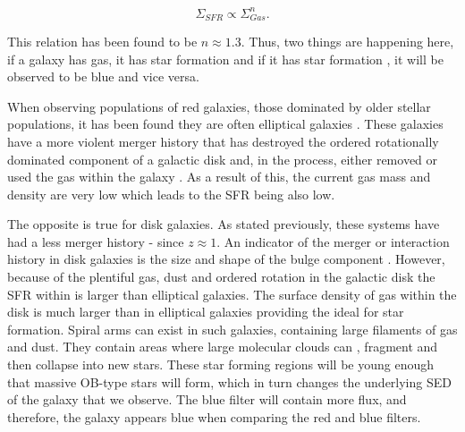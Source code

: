 \begin{equation}\label{eq:ks-law}
\Sigma_{SFR} \propto \Sigma_{Gas}^{n}. 
\end{equation}

\noindent This relation has been found to be $n\approx1.3$. Thus, two things are happening here, if a galaxy has \DIFaddbegin {}\DIFaddend gas, it has star formation and if it has star formation \DIFaddbegin {}\DIFaddend , it will be observed to be blue and vice versa.

When observing populations of red galaxies, those dominated by older stellar populations, it has been found they are often elliptical galaxies \citep{1992MNRAS.254..589B}. These galaxies have a more violent merger history that has destroyed the ordered rotationally dominated component of a galactic disk and, in the process, either removed or used the gas within the galaxy \citep{1976ApJ...204..365F}. As a result of this, the current gas mass and density are very low which leads to the SFR being also low.

The opposite is true for disk galaxies. As stated previously, these systems have had a less \DIFdelbegin {}\DIFdelend \DIFaddbegin {}\DIFaddend merger history - \DIFdelbegin {}\DIFdelend \DIFaddbegin {}\DIFaddend since $z \approx 1$. An indicator of the merger or interaction history in disk galaxies is the size and shape of the bulge component \citep{2011MNRAS.414..888E}. However, because of the plentiful gas, dust and ordered rotation in the galactic disk the SFR within is larger than elliptical galaxies. The surface density of gas within the disk is much larger than in elliptical galaxies providing the ideal for star formation. Spiral arms can exist in such galaxies, containing large filaments of gas and dust. They contain areas where large molecular clouds can \DIFdelbegin {}\DIFdelend \DIFaddbegin {}\DIFaddend , fragment and then collapse into new stars. These star forming regions will be young enough that massive OB-type stars will form, which in turn changes the underlying SED of the galaxy that we observe. The blue filter will contain more flux, and therefore, the galaxy appears blue when comparing the red and blue filters.

